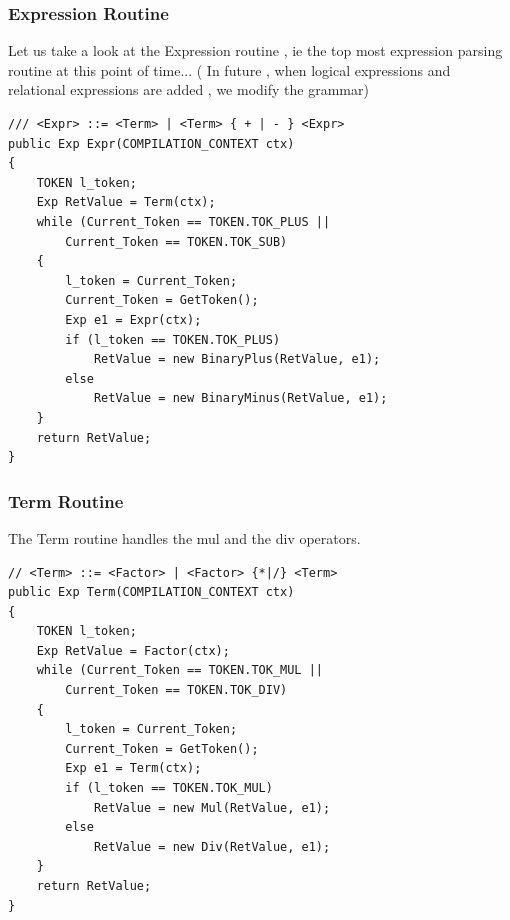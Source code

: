 \subsubsection{Expression Routine}
Let us take a look at the Expression routine , ie the top most expression parsing routine at this point of time... ( In future , when logical expressions and relational expressions are added , we modify the grammar)
\lstset{style=csharp}
\begin{lstlisting}
/// <Expr> ::= <Term> | <Term> { + | - } <Expr>
public Exp Expr(COMPILATION_CONTEXT ctx)
{
	TOKEN l_token;
	Exp RetValue = Term(ctx);
	while (Current_Token == TOKEN.TOK_PLUS || 
		Current_Token == TOKEN.TOK_SUB)
	{
		l_token = Current_Token;
		Current_Token = GetToken();
		Exp e1 = Expr(ctx);
		if (l_token == TOKEN.TOK_PLUS)
			RetValue = new BinaryPlus(RetValue, e1);
		else
			RetValue = new BinaryMinus(RetValue, e1);
	}
	return RetValue;
}
\end{lstlisting}
\subsubsection{Term Routine}
The Term routine handles the mul and the div operators. 
\lstset{style=csharp}
\begin{lstlisting}
// <Term> ::= <Factor> | <Factor> {*|/} <Term>
public Exp Term(COMPILATION_CONTEXT ctx)
{
	TOKEN l_token;
	Exp RetValue = Factor(ctx);
	while (Current_Token == TOKEN.TOK_MUL || 
		Current_Token == TOKEN.TOK_DIV)
	{
		l_token = Current_Token;
		Current_Token = GetToken();
		Exp e1 = Term(ctx);
		if (l_token == TOKEN.TOK_MUL)
			RetValue = new Mul(RetValue, e1);
		else
			RetValue = new Div(RetValue, e1);
	}
	return RetValue;
}
\end{lstlisting}
